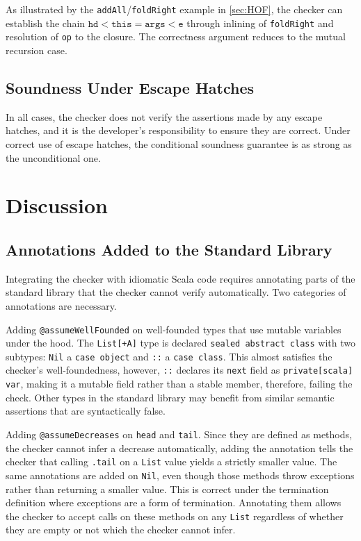 As illustrated by the \texttt{addAll}/\texttt{foldRight} example in
\autoref{sec:HOF}, the checker can establish the chain
$\texttt{hd} < \texttt{this} = \texttt{args} < \texttt{e}$ through inlining
of \texttt{foldRight} and resolution of \texttt{op} to the closure. The
correctness argument reduces to the mutual recursion case.


\section{Soundness Under Escape Hatches}
In all cases, the checker does not verify the assertions made by any escape
hatches, and it is the developer's responsibility to ensure they are correct.
Under correct use of escape hatches, the conditional soundness guarantee is as
strong as the unconditional one.


\chapter{Discussion}

\section{Annotations Added to the Standard Library}
Integrating the checker with idiomatic Scala code requires annotating parts of
the standard library that the checker cannot verify automatically.
Two categories of annotations are necessary.

Adding \texttt{@assumeWellFounded} on well-founded types that use mutable
variables under the hood. The \texttt{List[+A]} type is declared \texttt{sealed
abstract class} with two subtypes: \texttt{Nil} a \texttt{case object} and
\texttt{::} a \texttt{case class}. This almost satisfies the checker's
well-foundedness, however, \texttt{::} declares its \texttt{next} field as
\texttt{private[scala] var}, making it a mutable field rather than a stable
member, therefore, failing the check.
Other types in the standard library may benefit from similar semantic assertions
that are syntactically false.

Adding \texttt{@assumeDecreases} on \texttt{head} and \texttt{tail}. Since they
are defined as methods, the checker cannot infer a decrease automatically,
adding the annotation tells the checker that calling \texttt{.tail} on a
\texttt{List} value yields a strictly smaller value.
The same annotations are added on \texttt{Nil}, even though those methods throw
exceptions rather than returning a smaller value. This is correct under the
termination definition where exceptions are a form of termination. Annotating
them allows the checker to accept calls on these methods on any \texttt{List}
regardless of whether they are empty or not which the checker cannot infer.

